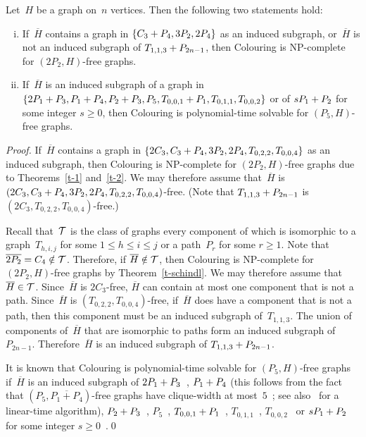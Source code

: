 \documentclass{llncs}
\newcommand{\NP}{{\sf NP}}
\begin{document}
\begin{theorem}\label{t-p5}
Let~$H$ be a graph on~$n$ vertices.
Then the following two statements hold:
\begin{enumerate}[(i)]
\item If~$\overline{H}$ contains a graph in $\{C_3+\nobreak P_4,3P_2,2P_4\}$ as an induced subgraph, or~$\overline{H}$ is not an induced subgraph of $T_{1,1,3}+\nobreak P_{2n-1}$, then {\sc Colouring} is \NP-complete for $(2P_2,H)$-free graphs.\\[-8pt]
\item If~$\overline{H}$ is an induced subgraph of a graph in $\{2P_1+\nobreak P_3,P_1+\nobreak P_4,P_2+\nobreak P_3,P_5,T_{0,0,1}+\nobreak P_1,\allowbreak T_{0,1,1},T_{0,0,2}\}$ or of $sP_1+\nobreak P_2$ for some integer $s\geq 0$, then {\sc Colouring} is polynomial-time solvable for $(P_5,H)$-free graphs.
\end{enumerate}
\end{theorem}

\begin{proof}
If~$\overline{H}$ contains a graph in $\{2C_3,C_3+\nobreak P_4,3P_2,2P_4,T_{0,2,2},T_{0,0,4}\}$ as an induced subgraph, then {\sc Colouring} is \NP-complete for $(2P_2,H)$-free graphs due to Theorems~\ref{t-1} and~\ref{t-2}.
We may therefore assume that~$\overline{H}$ is $(2C_3,C_3+\nobreak P_4,3P_2,2P_4,T_{0,2,2},T_{0,0,4})$-free.
(Note that $T_{1,1,3}+\nobreak P_{2n-1}$ is $(2C_3,T_{0,2,2},T_{0,0,4})$-free.)

Recall that~${\cal T}$ is the class of graphs every component of which is isomorphic to a graph~$T_{h,i,j}$ for some $1\leq h\leq i\leq j$ or a path~$P_r$ for some $r\geq 1$.
Note that $\overline{2P_2}=C_4 \notin {\cal T}$.
Therefore, if $\overline{H} \notin {\cal T}$, then {\sc Colouring} is \NP-complete for $(2P_2,H)$-free graphs by Theorem~\ref{t-schindl}.
We may therefore assume that $\overline{H} \in {\cal T}$. 
Since~$\overline{H}$ is $2C_3$-free, $\overline{H}$ can contain at most one component that is not a path.
Since~$\overline{H}$ is $(T_{0,2,2},T_{0,0,4})$-free, if~$\overline{H}$ does have a component that is not a path, then this component must be an induced subgraph of~$T_{1,1,3}$.
The union of components of~$\overline{H}$ that are isomorphic to paths form an induced subgraph of~$P_{2n-1}$.
Therefore~$\overline{H}$ is an induced subgraph of $T_{1,1,3}+\nobreak P_{2n-1}$.

It is known that {\sc Colouring} is polynomial-time solvable for $(P_5,H)$-free graphs if~$\overline{H}$ is an induced subgraph of
$2P_1+\nobreak P_3$~\cite{Ma},
$P_1+\nobreak P_4$ (this follows from the fact that $(P_5,\overline{P_1+P_4})$-free graphs have clique-width at most~$5$~\cite{BLM04}; see also~\cite{BBKRS05} for a linear-time algorithm),
$P_2+\nobreak P_3$~\cite{ML17},
$P_5$~\cite{HL},
$T_{0,0,1}+\nobreak P_1$~\cite{KMP},
$T_{0,1,1}$~\cite{KMP},
$T_{0,0,2}$~\cite{KMP}
or $sP_1+\nobreak P_2$ for some integer $s\geq 0$~\cite{ML17}.\qed
\end{proof}
\end{document}
